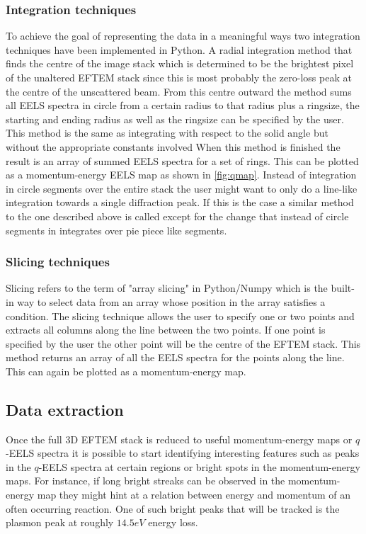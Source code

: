 \subsubsection{Integration techniques}
To achieve the goal of representing the data in a meaningful ways two integration techniques have been implemented in Python.
A radial integration method that finds the centre of the image stack which is determined to be the brightest pixel of the unaltered EFTEM stack since this is most probably the zero-loss peak at the centre of the unscattered beam.
From this centre outward the method sums all EELS spectra in circle from a certain radius to that radius plus a ringsize, the starting and ending radius as well as the ringsize can be specified by the user.
This method is the same as integrating with respect to the solid angle but without the appropriate constants involved
When this method is finished the result is an array of summed EELS spectra for a set of rings. This can be plotted as a momentum-energy EELS map as shown in \ref{fig:qmap}.
Instead of integration in circle segments over the entire stack the user might want to only do a line-like integration towards a single diffraction peak. If this is the case a similar method to the one described above is called except for the change that instead of circle segments in integrates over pie piece like segments.


\subsubsection{Slicing techniques}
Slicing refers to the term of "array slicing" in Python/Numpy which is the built-in way to select data from an array whose position in the array satisfies a condition. The slicing technique allows the user to specify one or two points and extracts all columns along the line between the two points. If one point is specified by the user the other point will be the centre of the EFTEM stack. This method returns an array of all the EELS spectra for the points along the line. This can again be plotted as a momentum-energy map.

\subsection{Data extraction}
Once the full 3D EFTEM stack is reduced to useful momentum-energy maps or $q$-EELS spectra it is possible to start identifying interesting features such as peaks in the $q$-EELS spectra at certain regions or bright spots in the momentum-energy maps. For instance, if long bright streaks can be observed in the momentum-energy map they might hint at a relation between energy and momentum of an often occurring reaction. One of such bright peaks that will be tracked is the plasmon peak at roughly $14.5eV$ energy loss.

